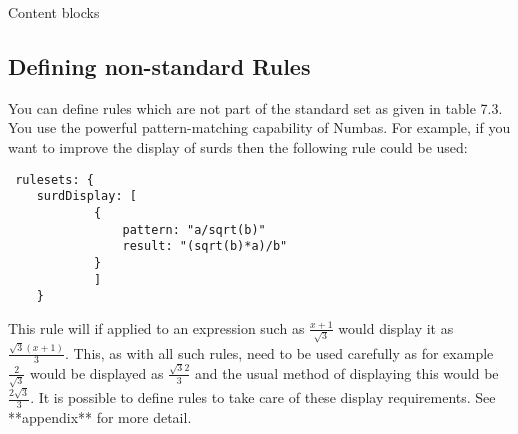 \begin{chapter}{\label{cha:content_blocks}Content blocks}
 \subsection{\label{sec:New rules} Defining non-standard Rules}
 You can define rules which are not part of the standard set as given in table 7.3.\\
 You use the powerful pattern-matching capability of Numbas. For example, if you want to improve the display of surds then the following rule could be used:
 \begin{Verbatim}
 rulesets: {
	surdDisplay: [
			{
				pattern: "a/sqrt(b)"
				result: "(sqrt(b)*a)/b"
			}
			]
	}
\end{Verbatim}
%
This rule will if applied to an expression such as $\frac{x+1}{\sqrt{3}}$ would display it as $\frac{\sqrt{3}(x+1)}{3}$.
This, as with all such rules, need to be used carefully as for example $\frac{2}{\sqrt{3}}$ would be displayed as $\frac{\sqrt{3}2}{3}$ and the usual method of displaying this would be $\frac{2\sqrt{3}}{3}$. It is possible to define rules to take care of these display requirements. See **appendix** for more detail. 
\end{chapter}
